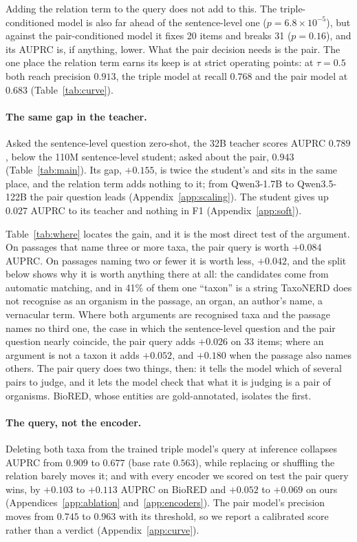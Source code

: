 \documentclass[11pt]{article}
\begin{document}
Adding the relation term to the query does not add to this. The triple-conditioned model is also far
ahead of the sentence-level one ($p = 6.8\times10^{-5}$), but against the pair-conditioned model it
fixes 20 items and breaks 31 ($p = 0.16$), and its AUPRC is, if anything, lower. What the pair
decision needs is the pair. The one place the relation term earns its keep is at strict operating points:
at $\tau = 0.5$ both reach precision $0.913$, the triple model at recall $0.768$ and the pair model
at $0.683$ (Table~\ref{tab:curve}).

\paragraph{The same gap in the teacher.}
Asked the sentence-level question zero-shot, the 32B teacher scores AUPRC $0.789$, below the 110M
sentence-level student; asked about the pair, $0.943$ (Table~\ref{tab:main}). Its gap, $+0.155$, is
twice the student's and sits in the same place, and the relation term adds nothing to it; from
Qwen3-1.7B to Qwen3.5-122B the pair question leads (Appendix~\ref{app:scaling}). The student gives up
$0.027$ AUPRC to its teacher and nothing in F1 (Appendix~\ref{app:soft}).

Table~\ref{tab:where} locates the gain, and it is the most direct test of the argument. On passages
that name three or more taxa, the pair query is worth $+0.084$ AUPRC. On passages naming two or
fewer it is worth less, $+0.042$, and the split below shows why it is worth anything there at all:
the candidates come from automatic matching, and in 41\% of them one ``taxon'' is a string TaxoNERD
does not recognise as an organism in the passage, an organ, an author's name, a vernacular term.
Where both arguments are recognised taxa and the passage names no third one, the case in which the
sentence-level question and the pair question nearly coincide, the pair query adds $+0.026$ on 33 items;
where an argument is not a taxon it adds $+0.052$, and $+0.180$ when the passage also names others.
The pair query does two things, then: it tells the model which of several pairs to judge, and it
lets the model check that what it is judging is a pair of organisms. BioRED, whose entities are
gold-annotated, isolates the first.

\paragraph{The query, not the encoder.}
\label{sec:res-ablation}
Deleting both taxa from the trained triple model's query at inference collapses AUPRC from $0.909$
to $0.677$ (base rate $0.563$), while replacing or shuffling the relation barely moves it; and with
every encoder we scored on test the pair query wins, by $+0.103$ to $+0.113$ AUPRC on BioRED and
$+0.052$ to $+0.069$ on ours (Appendices~\ref{app:ablation} and~\ref{app:encoders}). The pair
model's precision moves from $0.745$ to $0.963$ with its threshold, so we report a calibrated score
rather than a verdict (Appendix~\ref{app:curve}).
\end{document}
